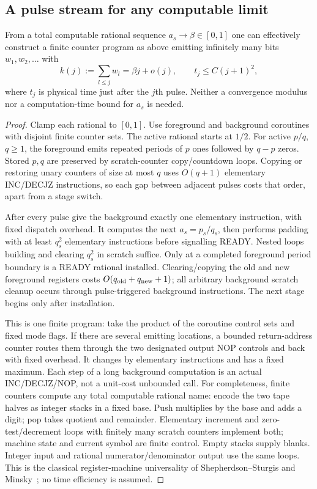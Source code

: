 \subsection{A pulse stream for any computable limit}
\begin{lemma}\label{lem:power-stream}
From a total computable rational sequence $a_s\to\beta\in[0,1]$ one can effectively construct a finite counter program as above emitting infinitely many bits $w_1,w_2,\ldots$ with
\[
 k(j):=\sum_{l\le j}w_l=\beta j+o(j),\qquad t_j\le C(j+1)^2,
\]
where $t_j$ is physical time just after the $j$th pulse. Neither a convergence modulus nor a computation-time bound for $a_s$ is needed.
\end{lemma}
\begin{proof}
Clamp each rational to $[0,1]$. Use foreground and background coroutines with disjoint finite counter sets. The active rational starts at $1/2$. For active $p/q$, $q\ge1$, the foreground emits repeated periods of $p$ ones followed by $q-p$ zeros. Stored $p,q$ are preserved by scratch-counter copy/countdown loops. Copying or restoring unary counters of size at most $q$ uses $O(q+1)$ elementary INC/DECJZ instructions, so each gap between adjacent pulses costs that order, apart from a stage switch.

After every pulse give the background exactly one elementary instruction, with fixed dispatch overhead. It computes the next $a_s=p_s/q_s$, then performs padding with at least $q_s^2$ elementary instructions before signalling READY. Nested loops building and clearing $q_s^2$ in scratch suffice. Only at a completed foreground period boundary is a READY rational installed. Clearing/copying the old and new foreground registers costs $O(q_{\rm old}+q_{\rm new}+1)$; all arbitrary background scratch cleanup occurs through pulse-triggered background instructions. The next stage begins only after installation.

This is one finite program: take the product of the coroutine control sets and fixed mode flags. If there are several emitting locations, a bounded return-address counter routes them through the two designated output NOP controls and back with fixed overhead. It changes by elementary instructions and has a fixed maximum. Each step of a long background computation is an actual INC/DECJZ/NOP, not a unit-cost unbounded call.
For completeness, finite counters compute any total computable rational name: encode the two tape halves as integer stacks in a fixed base. Push multiplies by the base and adds a digit; pop takes quotient and remainder. Elementary increment and zero-test/decrement loops with finitely many scratch counters implement both; machine state and current symbol are finite control. Empty stacks supply blanks. Integer input and rational numerator/denominator output use the same loops. This is the classical register-machine universality of Shepherdson--Sturgis and Minsky~\cite{SS63,Min61}; no time efficiency is assumed.


\end{proof}
